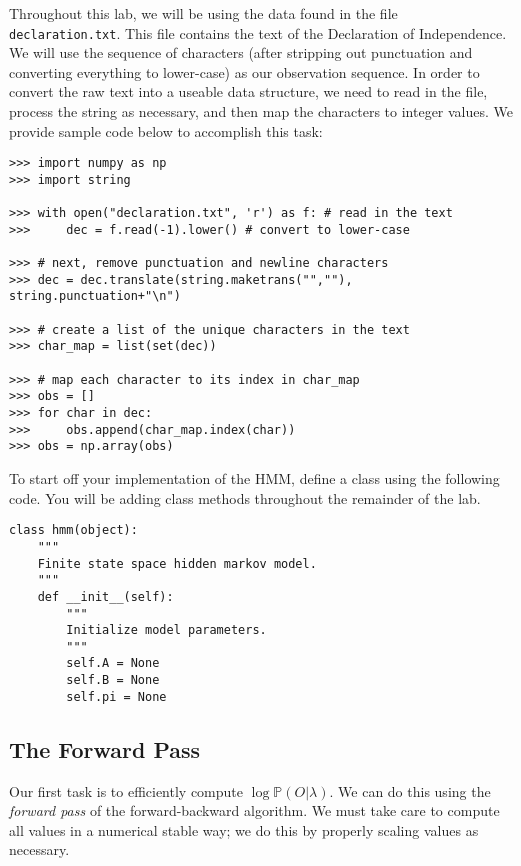 Throughout this lab, we will be using the data found in the file {\tt declaration.txt}.
This file contains the text of the Declaration of Independence.
We will use the sequence of characters (after stripping out punctuation and converting everything to lower-case) as our observation sequence.
In order to convert the raw text into a useable data structure, we need to read in the file, process the string as necessary, and then map the characters to integer values.
We provide sample code below to accomplish this task:
\begin{lstlisting}
>>> import numpy as np
>>> import string

>>> with open("declaration.txt", 'r') as f: # read in the text
>>>     dec = f.read(-1).lower() # convert to lower-case

>>> # next, remove punctuation and newline characters
>>> dec = dec.translate(string.maketrans("",""), string.punctuation+"\n")

>>> # create a list of the unique characters in the text
>>> char_map = list(set(dec))

>>> # map each character to its index in char_map
>>> obs = []
>>> for char in dec:
>>>     obs.append(char_map.index(char))
>>> obs = np.array(obs)
\end{lstlisting}

\begin{problem}
To start off your implementation of the HMM, define a class using the following code.
You will be adding class methods throughout the remainder of the lab.
\begin{lstlisting}
class hmm(object):
    """
    Finite state space hidden markov model.
    """
    def __init__(self):
        """
        Initialize model parameters.
        """
        self.A = None
        self.B = None
        self.pi = None
\end{lstlisting}
\end{problem}
\subsection*{The Forward Pass}
Our first task is to efficiently compute $\log \mathbb{P}(O | \lambda)$.
We can do this using the \emph{forward pass} of the forward-backward algorithm.
We must take care to compute all values in a numerical stable way; we do this by properly scaling values as necessary.

